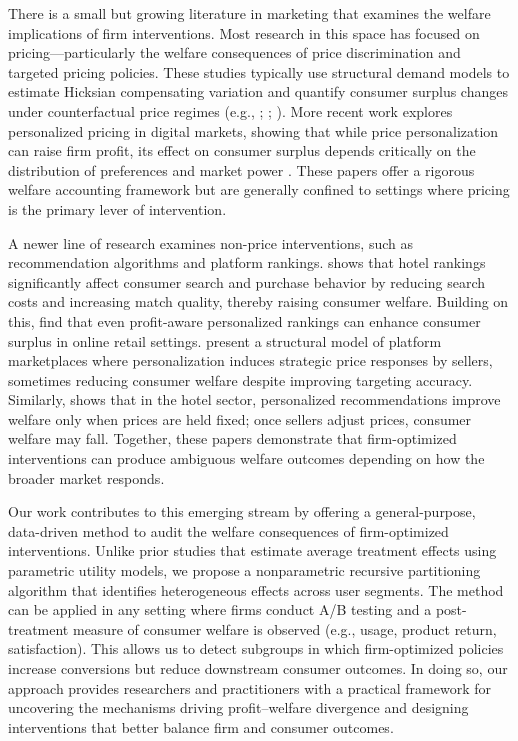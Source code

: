 \documentclass[11pt,letterpaper,english]{article}
\theoremstyle{definition}
\theoremstyle{definition}
\begin{document}
\begin{bibunit}
There is a small but growing literature in marketing that examines the welfare implications of firm interventions. Most research in this space has focused on pricing—particularly the welfare consequences of price discrimination and targeted pricing policies. These studies typically use structural demand models to estimate Hicksian compensating variation and quantify consumer surplus changes under counterfactual price regimes (e.g., \cite{petrin2002quantifying}; \cite{leslie2004price}; \cite{chintagunta2003balancing}). More recent work explores personalized pricing in digital markets, showing that while price personalization can raise firm profit, its effect on consumer surplus depends critically on the distribution of preferences and market power \citep{dube2023personalized}. These papers offer a rigorous welfare accounting framework but are generally confined to settings where pricing is the primary lever of intervention.

A newer line of research examines non-price interventions, such as recommendation algorithms and platform rankings. \cite{ursu2018power} shows that hotel rankings significantly affect consumer search and purchase behavior by reducing search costs and increasing match quality, thereby raising consumer welfare. Building on this, \cite{donnelly2024welfare} find that even profit-aware personalized rankings can enhance consumer surplus in online retail settings. \cite{zhou2023competing} present a structural model of platform marketplaces where personalization induces strategic price responses by sellers, sometimes reducing consumer welfare despite improving targeting accuracy. Similarly, \cite{kaye2024personalization} shows that in the hotel sector, personalized recommendations improve welfare only when prices are held fixed; once sellers adjust prices, consumer welfare may fall. Together, these papers demonstrate that firm-optimized interventions can produce ambiguous welfare outcomes depending on how the broader market responds.

Our work contributes to this emerging stream by offering a general-purpose, data-driven method to audit the welfare consequences of firm-optimized interventions. Unlike prior studies that estimate average treatment effects using parametric utility models, we propose a nonparametric recursive partitioning algorithm that identifies heterogeneous effects across user segments. The method can be applied in any setting where firms conduct A/B testing and a post-treatment measure of consumer welfare is observed (e.g., usage, product return, satisfaction). This allows us to detect subgroups in which firm-optimized policies increase conversions but reduce downstream consumer outcomes. In doing so, our approach provides researchers and practitioners with a practical framework for uncovering the mechanisms driving profit–welfare divergence and designing interventions that better balance firm and consumer outcomes.



\end{bibunit}
\end{document}

